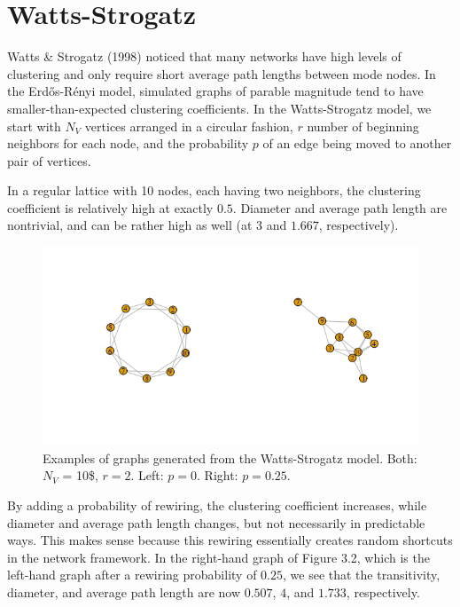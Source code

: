 \documentclass[12pt,twoside]{amherstthesis}
\begin{document}
  \section{Watts-Strogatz}\label{watts-strogatz}
  
  Watts \& Strogatz (1998) noticed that many networks have high levels of
  clustering and only require short average path lengths between mode
  nodes. In the Erdős-Rényi model, simulated graphs of parable magnitude
  tend to have smaller-than-expected clustering coefficients. In the
  Watts-Strogatz model, we start with \(N_V\) vertices arranged in a
  circular fashion, \(r\) number of beginning neighbors for each node, and
  the probability \(p\) of an edge being moved to another pair of
  vertices.
  
  In a regular lattice with 10 nodes, each having two neighbors, the
  clustering coefficient is relatively high at exactly \(0.5\). Diameter
  and average path length are nontrivial, and can be rather high as well
  (at \(3\) and \(1.667\), respectively).
  
  \begin{figure}[htbp]
  \centering
  \includegraphics{figure/22wattsstrogatzexample.png}
  \caption{Examples of graphs generated from the Watts-Strogatz model.
  Both: \(N_V\) = 10\$, \(r = 2\). Left: \(p = 0\). Right: \(p= 0.25\).}
  \end{figure}
  
  By adding a probability of rewiring, the clustering coefficient
  increases, while diameter and average path length changes, but not
  necessarily in predictable ways. This makes sense because this rewiring
  essentially creates random shortcuts in the network framework. In the
  right-hand graph of Figure 3.2, which is the left-hand graph after a
  rewiring probability of \(0.25\), we see that the transitivity,
  diameter, and average path length are now \(0.507\), \(4\), and
  \(1.733\), respectively.
  
\end{document}
